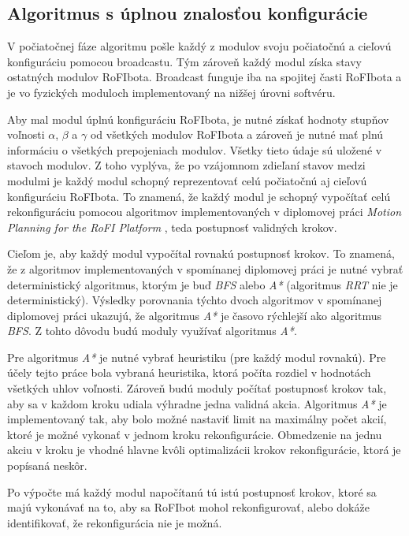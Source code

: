 \documentclass[
  digital, %
  oneside, %
  table,   %
  lof,     %
  nolot,     %
]{fithesis3}
\begin{document}
\subsection{Algoritmus s úplnou znalosťou konfigurácie}
\label{sec:motionPlanningAlgo}
V počiatočnej fáze algoritmu pošle každý z modulov svoju počiatočnú a cieľovú konfiguráciu pomocou broadcastu. Tým zároveň každý modul získa stavy ostatných modulov RoFIbota. Broadcast funguje iba na spojitej časti RoFIbota a je vo fyzických moduloch implementovaný na nižšej úrovni softvéru.

Aby mal modul úplnú konfiguráciu RoFIbota, je nutné získať hodnoty stupňov voľnosti $\alpha$, $\beta$ a $\gamma$ od všetkých modulov RoFIbota a zároveň je nutné mať plnú informáciu o všetkých prepojeniach modulov. Všetky tieto údaje sú uložené v stavoch modulov. Z toho vyplýva, že po vzájomnom zdieľaní stavov medzi modulmi je každý modul schopný reprezentovať celú počiatočnú aj cieľovú konfiguráciu RoFIbota. To znamená, že každý modul je schopný vypočítať celú rekonfiguráciu pomocou algoritmov implementovaných v diplomovej práci \textit{Motion Planning for the RoFI Platform} \cite{vozarovaMasterThesis}, teda postupnosť validných krokov. 

Cieľom je, aby každý modul vypočítal rovnakú postupnosť krokov. To znamená, že z algoritmov implementovaných v spomínanej diplomovej práci je nutné vybrať deterministický algoritmus, ktorým je buď \textit{BFS} alebo \textit{A*} (algoritmus \textit{RRT} nie je deterministický). Výsledky porovnania týchto dvoch algoritmov v spomínanej diplomovej práci ukazujú, že algoritmus \textit{A*} je časovo rýchlejší ako algoritmus \textit{BFS}. Z tohto dôvodu budú moduly využívať algoritmus \textit{A*}. 

Pre algoritmus \textit{A*} je nutné vybrať heuristiku (pre každý modul rovnakú). Pre účely tejto práce bola vybraná heuristika, ktorá počíta rozdiel v hodnotách všetkých uhlov voľnosti. Zároveň budú moduly počítať postupnosť krokov tak, aby sa v každom kroku udiala výhradne jedna validná akcia. Algoritmus \textit{A*} je implementovaný tak, aby bolo možné nastaviť limit na maximálny počet akcií, ktoré je možné vykonať v jednom kroku rekonfigurácie. Obmedzenie na jednu akciu v kroku je vhodné hlavne kvôli optimalizácii krokov rekonfigurácie, ktorá je popísaná neskôr. 

Po výpočte má každý modul napočítanú tú istú postupnosť krokov, ktoré sa majú vykonávať na to, aby sa RoFIbot mohol rekonfigurovať, alebo dokáže identifikovať, že rekonfigurácia nie je možná. 
\end{document}
